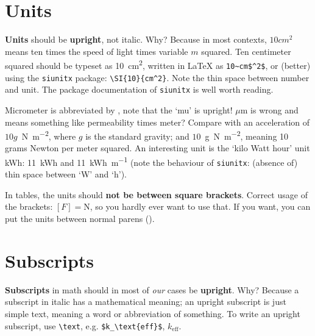 \documentclass[fleqn, 12pt]{iopart-mod}
\begin{document}
\section{Units}

\textbf{Units} should be \textbf{upright}, not italic. Why? Because in most contexts, $10 cm^2$ means ten times the speed of light times variable $m$ squared. Ten centimeter squared should be typeset as \SI{10}{cm^2}, written in \LaTeX{} as \verb|10~cm$^2$|, or (better) using the \verb|siunitx| package: \verb|\SI{10}{cm^2}|. Note the thin space between number and unit.
The package documentation of \verb|siunitx| is well worth reading.

Micrometer is abbreviated by \si{\micm}, note that the `mu' is upright! $\mu$m is wrong and means something like permeability times meter? Compare with an acceleration of $10g$~\si{N.m^{-2}}, where $g$ is the standard gravity; and $10$~\si{g.N.m^{-2}}, meaning 10 grams Newton per meter squared. An interesting unit is the `kilo Watt hour' unit \si{\kWh}: \SI{11}{\kWh} and \SI{11}{\kWh\per\metre} (note the behaviour of \verb|siunitx|: (absence of) thin space between `W' and `h').

In tables, the units should \textbf{not be between square brackets}. Correct usage of the brackets: $\left[ F \right] = \si{\newton}$, so you hardly ever want to use that. If you want, you can put the units between normal parens ().

\section{Subscripts}
\textbf{Subscripts} in math should in most of \emph{our} cases be \textbf{upright}. Why? Because a subscript in italic has a mathematical meaning; an upright subscript is just simple text, meaning a word or abbreviation of something. To write an upright subscript, use \verb|\text|, e.g. \verb|$k_\text{eff}$|, $k_\text{eff}$.
\end{document}
